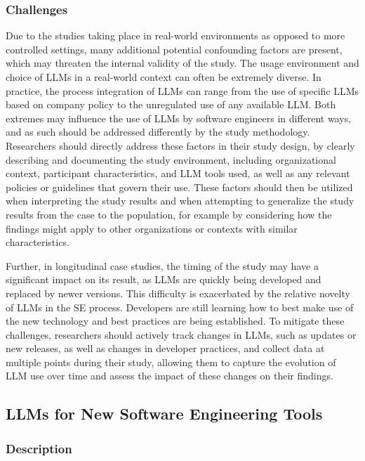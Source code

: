 \subsubsection{Challenges}

Due to the studies taking place in real-world environments as opposed to more controlled settings, many additional potential confounding factors are present, which may threaten the internal validity of the study.
The usage environment and choice of LLMs in a real-world context can often be extremely diverse.
In practice, the process integration of LLMs can range from the use of specific LLMs based on company policy to the unregulated use of any available LLM. 
Both extremes may influence the use of LLMs by software engineers in different ways, and as such should be addressed differently by the study methodology.
Researchers should directly address these factors in their study design, by clearly describing and documenting the study environment, including organizational context, participant characteristics, and LLM tools used, as well as any relevant policies or guidelines that govern their use.
These factors should then be utilized when interpreting the study results and when attempting to generalize the study results from the case to the population, for example by considering how the findings might apply to other organizations or contexts with similar characteristics.

Further, in longitudinal case studies, the timing of the study may have a significant impact on its result, as LLMs are quickly being developed and replaced by newer versions.
This difficulty is exacerbated by the relative novelty of LLMs in the SE process.
Developers are still learning how to best make use of the new technology and best practices are being established.
To mitigate these challenges, researchers should actively track changes in LLMs, such as updates or new releases, as well as changes in developer practices, and collect data at multiple points during their study, allowing them to capture the evolution of LLM use over time and assess the impact of these changes on their findings.

\subsection{LLMs for New Software Engineering Tools}

\subsubsection{Description}

